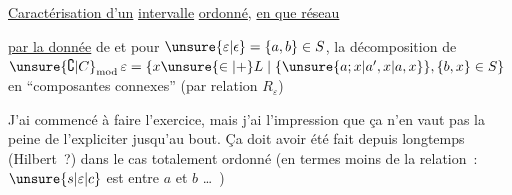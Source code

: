 \uline{Caractérisation d'un} \uline{intervalle}  \uline{ordonné}, \uline{en  que réseau}

\uline{par la donnée} de
et pour $\unsure{\varepsilon|\epsilon}=\{a,b\}\in S$, la décomposition de  $\unsure{\complement|C}_{\mathrm{mod}}\,\varepsilon=\{x\unsure{\in|+}L\mid\{\unsure{a;x|a',x|a,x}\},\{b,x\}\in S\}$ en ``composantes connexes'' (par relation $R_\varepsilon$)

J'ai commencé à faire l'exercice, mais j'ai l'impression que ça n'en vaut pas la peine de l'expliciter jusqu'au bout. Ça doit avoir été fait depuis longtemps (Hilbert~?) dans le cas totalement ordonné  (en termes  moins de la relation~: $\unsure{s|\varepsilon|c}$ est entre $a$ et $b$ \ldots\ )
